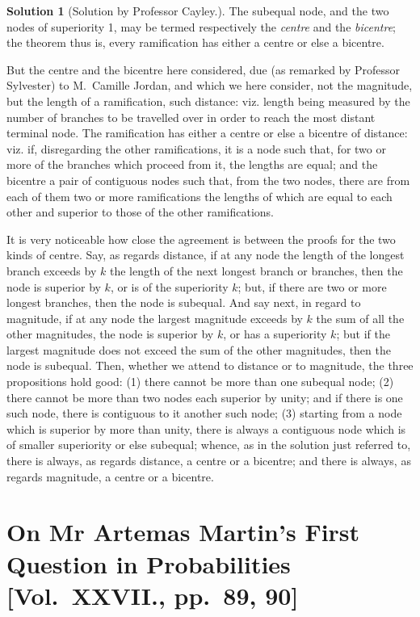\documentclass[11pt,a4paper]{article}
\theoremstyle{definition}
\newtheorem*{solution}{Solution}
\begin{document}
\begin{solution}[Solution by Professor Cayley.]
The subequal node, and the two nodes of superiority 1, may be termed respectively the \textit{centre} and the \textit{bicentre}; the theorem thus is, every ramification has either a centre or else a bicentre.

But the centre and the bicentre here considered, due (as remarked by Professor Sylvester) to M.~Camille Jordan, and which we here consider, not the magnitude, but the length of a ramification, such distance: viz. length being measured by the number of branches to be travelled over in order to reach the most distant terminal node. The ramification has either a centre or else a bicentre of distance: viz. if, disregarding the other ramifications, it is a node such that, for two or more of the branches which proceed from it, the lengths are equal; and the bicentre a pair of contiguous nodes such that, from the two nodes, there are from each of them two or more ramifications the lengths of which are equal to each other and superior to those of the other ramifications.

It is very noticeable how close the agreement is between the proofs for the two kinds of centre. Say, as regards distance, if at any node the length of the longest branch exceeds by $k$ the length of the next longest branch or branches, then the node is superior by $k$, or is of the superiority $k$; but, if there are two or more longest branches, then the node is subequal. And say next, in regard to magnitude, if at any node the largest magnitude exceeds by $k$ the sum of all the other magnitudes, the node is superior by $k$, or has a superiority $k$; but if the largest magnitude does not exceed the sum of the other magnitudes, then the node is subequal. Then, whether we attend to distance or to magnitude, the three propositions hold good: (1) there cannot be more than one subequal node; (2) there cannot be more than two nodes each superior by unity; and if there is one such node, there is contiguous to it another such node; (3) starting from a node which is superior by more than unity, there is always a contiguous node which is of smaller superiority or else subequal; whence, as in the solution just referred to, there is always, as regards distance, a centre or a bicentre; and there is always, as regards magnitude, a centre or a bicentre.
\end{solution}

\newpage

\section*{On Mr Artemas Martin's First Question in Probabilities [Vol.~XXVII., pp.~89, 90]}
\end{document}
